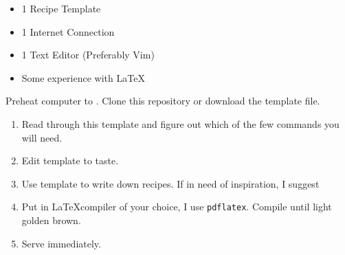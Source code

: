 \RequirePackage{../recipe}




\thispagestyle{firstpage}

\ingredients
\begin{itemize}
    \item 1 Recipe Template
    \item 1 Internet Connection
    \item 1 Text Editor (Preferably Vim)
    \item Some experience with \LaTeX
\end{itemize}

\instructions
Preheat computer to . Clone this repository or download the template file.
\begin{enumerate}
    \item Read through this template and figure out which of the few commands you will need.
    \item Edit template to taste.
    \item Use template to write down recipes. If in need of inspiration, I suggest 
    \item Put in \LaTeX compiler of your choice, I use \texttt{pdflatex}. Compile until light golden brown.
    \item Serve immediately.
\end{enumerate}

\spewfootnotes


